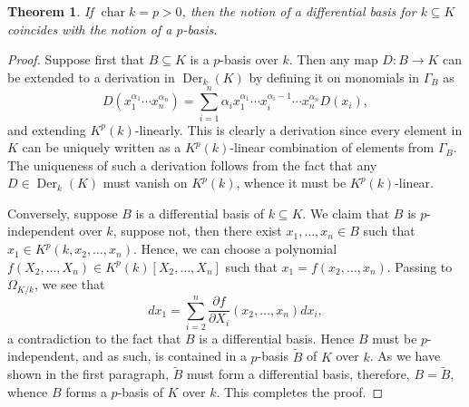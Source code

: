 \documentclass[10pt]{article}
\theoremstyle{thmstyle}
\newtheorem{theorem}{Theorem}[section]
\theoremstyle{defstyle}
\newcommand{\chr}{\operatorname{char}}
\newcommand{\wt}[1]{\widetilde{#1}}
\newcommand{\Der}{\operatorname{Der}}
\begin{document}
\begin{theorem}
    If $\chr k = p > 0$, then the notion of a differential basis for $k\subseteq K$ coincides with the notion of a $p$-basis.
\end{theorem}
\begin{proof}
    Suppose first that $B\subseteq K$ is a $p$-basis over $k$. Then any map $D\colon B\to K$ can be extended to a derivation in $\Der_k(K)$ by defining it on monomials in $\Gamma_B$ as
    \begin{equation*}
        D(x_1^{\alpha_1}\cdots x_n^{\alpha_n}) = \sum_{i = 1}^n \alpha_i x_1^{\alpha_1}\cdots x_i^{\alpha_i - 1}\cdots x_n^{\alpha_n} D(x_i),
    \end{equation*}
    and extending $K^p(k)$-linearly. This is clearly a derivation since every element in $K$ can be uniquely written as a $K^p(k)$-linear combination of elements from $\Gamma_B$. The uniqueness of such a derivation follows from the fact that any $D\in\Der_k(K)$ must vanish on $K^p(k)$, whence it must be $K^p(k)$-linear.

    Conversely, suppose $B$ is a differential basis of $k\subseteq K$. We claim that $B$ is $p$-independent over $k$, suppose not, then there exist $x_1,\dots,x_n\in B$ such that $x_1\in K^p(k, x_2,\dots, x_n)$. Hence, we can choose a polynomial $f(X_2,\dots,X_n)\in K^p(k)[X_2,\dots,X_n]$ such that $x_1 = f(x_2,\dots,x_n)$. Passing to $\Omega_{K/k}$, we see that 
    \begin{equation*}
        dx_1 = \sum_{i = 2}^n \frac{\partial f}{\partial X_i}(x_2,\dots,x_n) dx_i,
    \end{equation*}
    a contradiction to the fact that $B$ is a differential basis. Hence $B$ must be $p$-independent, and as such, is contained in a $p$-basis $\wt B$ of $K$ over $k$. As we have shown in the first paragraph, $\wt B$ must form a differential basis, therefore, $B = \wt B$, whence $B$ forms a $p$-basis of $K$ over $k$. This completes the proof.
\end{proof}



\end{document}
